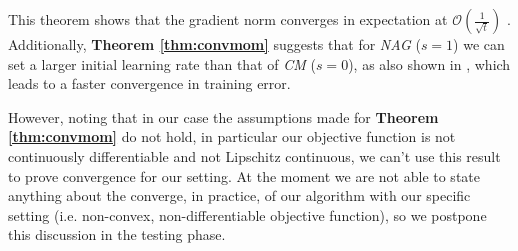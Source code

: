 This theorem shows that the gradient norm converges in expectation at $\mathcal{O}(\frac{1}{\sqrt{t}})$ \cite{sgdunified}.
Additionally, \textbf{Theorem \ref{thm:convmom}} suggests that for \textit{NAG} ($s=1$) we can set a larger initial learning rate than that of \textit{CM} ($s=0$), as also shown in \parencite[Section 4]{sgdunified}, which leads to a faster convergence in training error.

However, noting that in our case the assumptions made for \textbf{Theorem \ref{thm:convmom}} do not hold, in particular our objective function is not continuously differentiable and not Lipschitz continuous, we can't use this result to prove convergence for our setting. At the moment we are not able to state anything about the converge, in practice, of our algorithm with our specific setting (i.e. non-convex, non-differentiable objective function), so we postpone this discussion in the testing phase.
